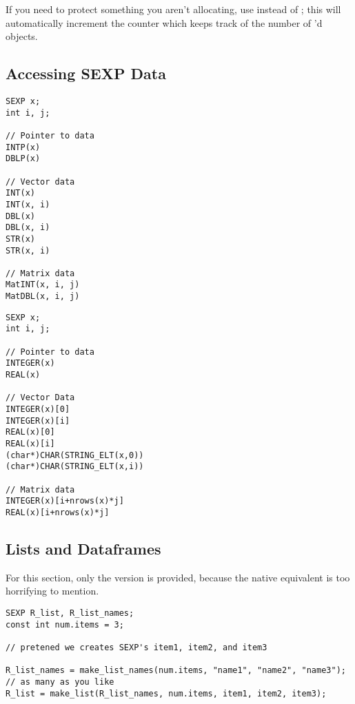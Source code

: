 If you need to protect something you aren't allocating, use  instead 
of ; this will automatically increment the counter which keeps 
track of the number of 'd objects.



\subsection{Accessing SEXP Data}

\begin{center}
\begin{minipage}{.485\textwidth}\centering
\begin{lstlisting}[language=fanC,title=SEXPtools Data Accessors]
SEXP x;
int i, j;

// Pointer to data
INTP(x)
DBLP(x)

// Vector data
INT(x)
INT(x, i)
DBL(x)
DBL(x, i) 
STR(x)
STR(x, i)

// Matrix data
MatINT(x, i, j)
MatDBL(x, i, j) 
\end{lstlisting}
\end{minipage}
\hspace{.2cm}
\begin{minipage}{.485\textwidth}\centering
\begin{lstlisting}[language=fanC,title=Native Data Accessors]
SEXP x;
int i, j;

// Pointer to data
INTEGER(x)
REAL(x)

// Vector Data
INTEGER(x)[0]
INTEGER(x)[i]
REAL(x)[0]
REAL(x)[i]
(char*)CHAR(STRING_ELT(x,0))
(char*)CHAR(STRING_ELT(x,i))

// Matrix data
INTEGER(x)[i+nrows(x)*j]
REAL(x)[i+nrows(x)*j]
\end{lstlisting}
\end{minipage}
\end{center}



\subsection{Lists and Dataframes}

For this section, only the \thispackage version is provided, because the native 
equivalent is too horrifying to mention.
\begin{lstlisting}[language=fanC,title=Lists]
SEXP R_list, R_list_names;
const int num.items = 3;

// pretened we creates SEXP's item1, item2, and item3

R_list_names = make_list_names(num.items, "name1", "name2", "name3"); // as many as you like
R_list = make_list(R_list_names, num.items, item1, item2, item3);
\end{lstlisting}

